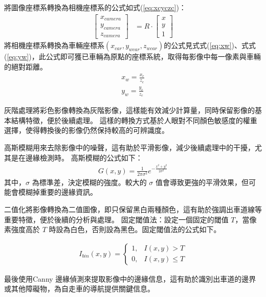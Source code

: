 \documentclass[12pt]{article}       %
\begin{document}
將圖像座標系轉換為相機座標系的公式如式(\ref{eq:xcyczc})：
\begin{align}
    \begin{bmatrix}
        x_{camera}   \\
        y_{camera}   \\
        z_{camera}        
    \end{bmatrix} 
     &=R\cdot
     \begin{bmatrix}
        x       \\
        y       \\
        1        
    \end{bmatrix} 
    \label{eq:xcyczc}
\end{align}
將相機座標系轉換為車輛座標系$(x_{car},y_{wcar},z_{wcar})$的公式見式式(\ref{eq:xw})、式式(\ref{eq:yw})，此公式即可獲已車輛為原點的座標系統，取得每影像中每一像素與車輛的絕對距離。
\begin{align}
    x_{w}=\frac{x_{c}}{z_{c}}
    \label{eq:xw}\\
    y_{w}=\frac{y_{c}}{z_{c}}
    \label{eq:yw}
\end{align}

灰階處理將彩色影像轉換為灰階影像，這樣能有效減少計算量，同時保留影像的基本結構特徵，便於後續處理。
這樣的轉換方式基於人眼對不同顏色敏感度的權重選擇，使得轉換後的影像仍然保持較高的可辨識度。

高斯模糊用來去除影像中的噪聲，這有助於平滑影像，減少後續處理中的干擾，尤其是在邊緣檢測時。
高斯模糊的公式如下：
\begin{align}
G(x,y) = \frac{1}{2\pi\sigma^2} e^{-\frac{x^2 + y^2}{2\sigma^2}}
\end{align}
其中，$\sigma$ 為標準差，決定模糊的強度。較大的 $\sigma$ 值會導致更強的平滑效果，但可能會模糊掉重要的邊緣資訊。

二值化將影像轉換為二值圖像，即只保留黑白兩種顏色，這有助於強調出車道線等重要特徵，便於後續的分析與處理。
固定閾值法：設定一個固定的閾值 $T$，當像素強度高於 $T$ 時設為白色，否則設為黑色。固定閾值法的公式如下。

\begin{align}
    I_{bin}(x,y) = 
    \begin{cases}
        1, & I(x,y) > T \\
        0, & I(x,y) \leq T
    \end{cases}
\end{align}

最後使用Canny 邊緣偵測來提取影像中的邊緣信息，這有助於識別出車道的邊界或其他障礙物，為自走車的導航提供關鍵信息。
\end{document}

